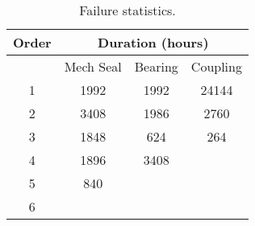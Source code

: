 \begin{table}[h]
	\caption{Failure statistics.}
	\label{ch05_tbl_failuredata}
	{\footnotesize
\begin{tabular}{c|c|c|c}
	\hline
	Order & \multicolumn{3}{c}{Duration (hours)} \\ 
	\hline
	& Mech Seal & Bearing & Coupling \\ 
	\hline
	1 & 1992 & 1992 & 24144 \\ 
	2 & 3408 & 1986 & 2760 \\ 
	3 & 1848 & 624 & 264 \\ 
	4 & 1896 & 3408 &  \\ 
	5 & 840 &  &  \\ 
	6 &  &  &  \\ 
	\hline
\end{tabular}

	}
\end{table}